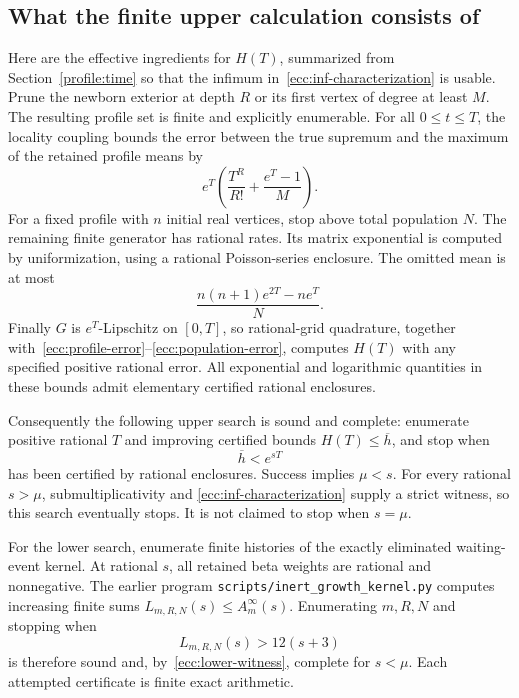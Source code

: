 \subsection{What the finite upper calculation consists of}

Here are the effective ingredients for $H(T)$, summarized from Section~\ref{profile:time} so
that the infimum in~\eqref{ecc:inf-characterization} is usable.
Prune the newborn exterior at depth $R$ or its first vertex of degree
at least $M$.  The resulting profile set is finite and explicitly
enumerable.  For all $0\le t\le T$, the locality coupling bounds
the error between the true supremum and the maximum of the retained
profile means by
\begin{equation}\label{ecc:profile-error}
 e^T\left(\frac{T^R}{R!}+\frac{e^T-1}{M}\right).
\end{equation}
For a fixed profile with $n$ initial real vertices, stop above total
population $N$.  The remaining finite generator has rational rates.
Its matrix exponential is computed by uniformization, using a rational
Poisson-series enclosure.  The omitted mean is at most
\begin{equation}\label{ecc:population-error}
 \frac{n(n+1)e^{2T}-ne^T}{N}.
\end{equation}
Finally $G$ is $e^T$-Lipschitz on $[0,T]$, so rational-grid quadrature,
together with~\eqref{ecc:profile-error}--\eqref{ecc:population-error},
computes $H(T)$ with any specified positive rational error.
All exponential and logarithmic quantities in these bounds admit
elementary certified rational enclosures.

Consequently the following upper search is sound and complete:
enumerate positive rational $T$ and improving certified bounds
$H(T)\le\overline h$, and stop when
\begin{equation}\label{ecc:upper-witness}
 \overline h<e^{sT}
\end{equation}
has been certified by rational enclosures.  Success implies $\mu<s$.
For every rational $s>\mu$, submultiplicativity and
\eqref{ecc:inf-characterization} supply a strict witness, so this search
eventually stops.  It is not claimed to stop when $s=\mu$.

For the lower search, enumerate finite histories of the exactly
eliminated waiting-event kernel.  At rational $s$, all retained beta
weights are rational and nonnegative.  The earlier program
\texttt{scripts/inert\_growth\_kernel.py} computes increasing finite sums
$L_{m,R,N}(s)\le A_m^\infty(s)$.  Enumerating $m,R,N$ and stopping when
\[
 L_{m,R,N}(s)>12(s+3)
\]
is therefore sound and, by~\eqref{ecc:lower-witness}, complete for
$s<\mu$.  Each attempted certificate is finite exact arithmetic.

